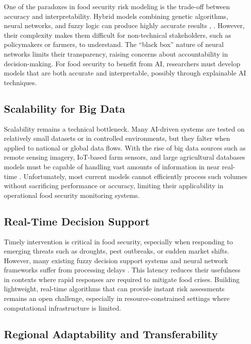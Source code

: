 \documentclass[preprint,12pt]{elsarticle}
\begin{document}
	One of the paradoxes in food security risk modeling is the trade-off
	between accuracy and interpretability. Hybrid models combining genetic
	algorithms, neural networks, and fuzzy logic can produce highly accurate
	results \cite{ref9}, \cite{ref4}. However, their complexity makes them difficult for
	non-technical stakeholders, such as policymakers or farmers, to
	understand. The ``black box'' nature of neural networks limits their
	transparency, raising concerns about accountability in decision-making.
	For food security to benefit from AI, researchers must develop models
	that are both accurate and interpretable, possibly through explainable
	AI techniques.
	
	\subsection{Scalability for Big Data}
	
	Scalability remains a technical bottleneck. Many AI-driven systems are
	tested on relatively small datasets or in controlled environments, but
	they falter when applied to national or global data flows. With the rise
	of big data sources such as remote sensing imagery, IoT-based farm
	sensors, and large agricultural databases models must be capable of
	handling vast amounts of information in near real-time \cite{ref11}.
	Unfortunately, most current models cannot efficiently process such
	volumes without sacrificing performance or accuracy, limiting their
	applicability in operational food security monitoring systems.
	
	\subsection{Real-Time Decision Support}
	
	Timely intervention is critical in food security, especially when
	responding to emerging threats such as droughts, pest outbreaks, or
	sudden market shifts. However, many existing fuzzy decision support
	systems and neural network frameworks suffer from processing delays
	\cite{ref63}. This latency reduces their usefulness in contexts where rapid
	responses are required to mitigate food crises. Building lightweight,
	real-time algorithms that can provide instant risk assessments remains
	an open challenge, especially in resource-constrained settings where
	computational infrastructure is limited.
	
	\subsection{Regional Adaptability and Transferability}
	
\end{document}
